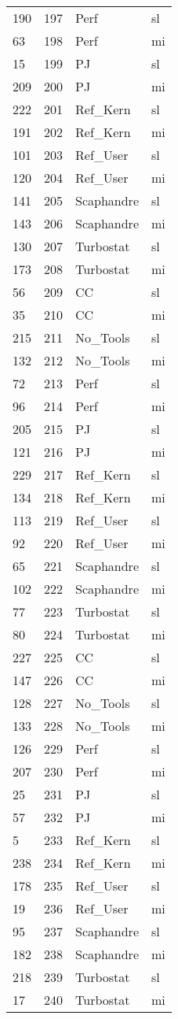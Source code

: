 \begin{tabular}{lrll}
190 & 197 & Perf & sl \\
63 & 198 & Perf & mi \\
15 & 199 & PJ & sl \\
209 & 200 & PJ & mi \\
222 & 201 & Ref_Kern & sl \\
191 & 202 & Ref_Kern & mi \\
101 & 203 & Ref_User & sl \\
120 & 204 & Ref_User & mi \\
141 & 205 & Scaphandre & sl \\
143 & 206 & Scaphandre & mi \\
130 & 207 & Turbostat & sl \\
173 & 208 & Turbostat & mi \\
56 & 209 & CC & sl \\
35 & 210 & CC & mi \\
215 & 211 & No_Tools & sl \\
132 & 212 & No_Tools & mi \\
72 & 213 & Perf & sl \\
96 & 214 & Perf & mi \\
205 & 215 & PJ & sl \\
121 & 216 & PJ & mi \\
229 & 217 & Ref_Kern & sl \\
134 & 218 & Ref_Kern & mi \\
113 & 219 & Ref_User & sl \\
92 & 220 & Ref_User & mi \\
65 & 221 & Scaphandre & sl \\
102 & 222 & Scaphandre & mi \\
77 & 223 & Turbostat & sl \\
80 & 224 & Turbostat & mi \\
227 & 225 & CC & sl \\
147 & 226 & CC & mi \\
128 & 227 & No_Tools & sl \\
133 & 228 & No_Tools & mi \\
126 & 229 & Perf & sl \\
207 & 230 & Perf & mi \\
25 & 231 & PJ & sl \\
57 & 232 & PJ & mi \\
5 & 233 & Ref_Kern & sl \\
238 & 234 & Ref_Kern & mi \\
178 & 235 & Ref_User & sl \\
19 & 236 & Ref_User & mi \\
95 & 237 & Scaphandre & sl \\
182 & 238 & Scaphandre & mi \\
218 & 239 & Turbostat & sl \\
17 & 240 & Turbostat & mi \\
\bottomrule
\end{tabular}
